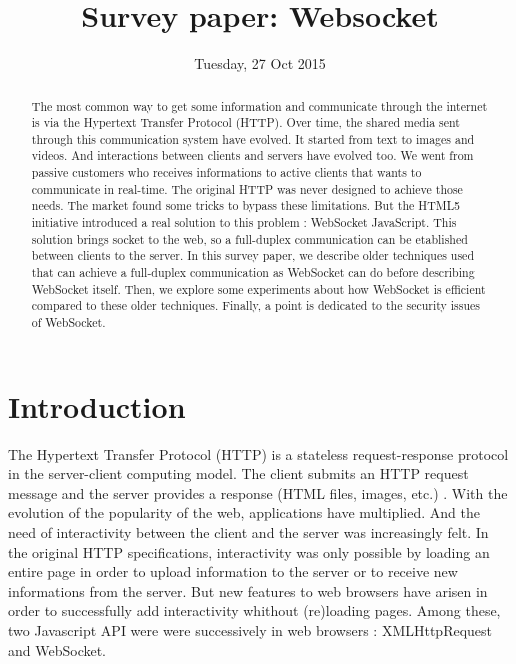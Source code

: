 \documentclass[journal,compsoc]{IEEEtran}
\newcommand{\ws}{WebSocket}
\begin{document}
\author{}

\title{Survey paper: Websocket}

\date{Tuesday, 27 Oct 2015}

\maketitle
\IEEEpeerreviewmaketitle



\begin{abstract}
The most common way to get some information and communicate through the internet is via the Hypertext Transfer Protocol (HTTP).
Over time, the shared media sent through this communication system have evolved.
It started from text to images and videos.
And interactions between clients and servers have evolved too.
We went from passive customers who receives informations to active clients that wants to communicate in real-time.
The original HTTP was never designed to achieve those needs.
The market found some tricks to bypass these limitations.
But the HTML5 initiative introduced a real solution to this problem : \ws{} JavaScript.
This solution brings socket to the web, so a full-duplex communication can be etablished between clients to the server.
In this survey paper, we describe older techniques used that can achieve a full-duplex communication as \ws{} can do before describing \ws{} itself.
Then, we explore some experiments about how \ws{} is efficient compared to these older techniques.
Finally, a point is dedicated to the security issues of \ws.
\end{abstract}


\section{Introduction}

The Hypertext Transfer Protocol (HTTP) is a stateless request-response protocol in the server-client computing model. 
The client submits an HTTP request message and the server provides a response (HTML files, images, etc.) \cite{rfc2616}. 
With the evolution of the popularity of the web, applications have multiplied.
And the need of interactivity between the client and the server was increasingly felt. 
In the original HTTP specifications, interactivity was only possible by loading an entire page in order to upload information to the server or to receive new informations from the server.
But new features to web browsers have arisen in order to successfully add interactivity whithout (re)loading pages.
Among these, two Javascript API were were successively in web browsers : XMLHttpRequest and \ws.
\end{document}
